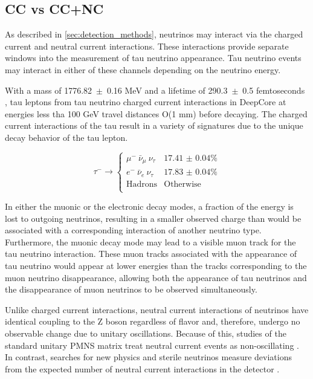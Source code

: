 \label{subsec:cc_vs_ccnc}
\subsection{CC vs CC+NC}
As described in \ref{sec:detection_methods}, neutrinos may interact via the charged current and neutral current interactions.
These interactions provide separate windows into the measurement of tau neutrino appearance.
Tau neutrino events may interact in either of these channels depending on the neutrino energy.

With a mass of 1776.82~$\pm$~0.16 MeV and a lifetime of 290.3~$\pm$~0.5 femtoseconds \cite{PDG-2015}, tau leptons from tau neutrino charged current interactions in DeepCore at energies less tha 100 GeV travel distances O(1 mm) before decaying.
The charged current interactions of the tau result in a variety of signatures due to the unique decay behavior of the tau lepton.

\label{eqn:tau_decay_modes}
\begin{equation}
	\tau^- \rightarrow 
		\begin{cases} 
			\mu^- \ \bar{\nu}_\mu \ \nu_\tau & \mbox{17.41 $\pm$ 0.04\%} \\ 
			e^- \ \bar{\nu}_e \  \nu_\tau & \mbox{17.83 $\pm$ 0.04\%} \\ 
			\mbox{Hadrons} & \mbox{Otherwise} \\ 
		\end{cases}
\end{equation}

In either the muonic or the electronic decay modes, a fraction of the energy is lost to outgoing neutrinos, resulting in a smaller observed charge than would be associated with a corresponding interaction of another neutrino type.
Furthermore, the muonic decay mode may lead to a visible muon track for the tau neutrino interaction.
These muon tracks associated with the appearance of tau neutrino would appear at lower energies than the tracks corresponding to the muon neutrino disappearance, allowing both the appearance of tau neutrinos and the disappearance of muon neutrinos to be observed simultaneously.

Unlike charged current interactions, neutral current interactions of neutrinos have identical coupling to the Z boson regardless of flavor and, therefore, undergo no observable change due to unitary oscillations.
Because of this, studies of the standard unitary PMNS matrix treat neutral current events as non-oscillating \cite{SuperK-Tau2013,SuperK-Tau2017,OPERA-Tau2015,IceCube-Oscillation2018}.
In contrast, searches for new physics and sterile neutrinos measure deviations from the expected number of neutral current interactions in the detector \cite{MINOS-SterileNC-2011}.

